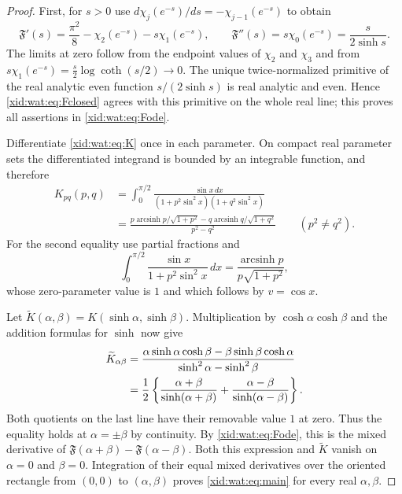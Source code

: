 \documentclass[11pt,a4paper]{article}
\numberwithin{equation}{section}
\theoremstyle{definition}
\theoremstyle{remark}
\begin{document}
\begin{proof}
First, for $s>0$ use
$d\chi_j(e^{-s})/ds=-\chi_{j-1}(e^{-s})$ to obtain
\[
 \mathfrak F'(s)=\frac{\pi^2}{8}
              -\chi_2(e^{-s})-s\chi_1(e^{-s}),
 \qquad
 \mathfrak F''(s)=s\chi_0(e^{-s})
                =\frac{s}{2\sinh s}.
\]
The limits at zero follow from the endpoint values of $\chi_2$ and
$\chi_3$ and from
$s\chi_1(e^{-s})=\tfrac{s}{2}\log\coth(s/2)\to0$.
The unique twice-normalized primitive of the real analytic even
function $s/(2\sinh s)$ is real analytic and even. Hence
\eqref{xid:wat:eq:Fclosed} agrees with this primitive on the whole real
line; this proves all assertions in \eqref{xid:wat:eq:Fode}.

Differentiate \eqref{xid:wat:eq:K} once in each parameter. On compact
real parameter sets the differentiated integrand is bounded by an
integrable function, and therefore
\begin{align*}
 K_{pq}(p,q)
 &=\int_0^{\pi/2}
       \frac{\sin x\,dx}
       {(1+p^2\sin^2x)(1+q^2\sin^2x)}\\
 &=\frac{p\operatorname{arcsinh}p/\sqrt{1+p^2}
       -q\operatorname{arcsinh}q/\sqrt{1+q^2}}{p^2-q^2}
       \qquad(p^2\ne q^2).
\end{align*}
For the second equality use partial fractions and
\[
 \int_0^{\pi/2}\frac{\sin x}{1+p^2\sin^2x}\,dx
       =\frac{\operatorname{arcsinh}p}{p\sqrt{1+p^2}},
\]
whose zero-parameter value is $1$ and which follows by
$v=\cos x$.

Let $\widetilde K(\alpha,\beta)=K(\sinh\alpha,\sinh\beta)$.
Multiplication by $\cosh\alpha\cosh\beta$ and the addition formulas
for $\sinh$ now give
\begin{align}\label{xid:wat:eq:hyperbolicmixed}
 \widetilde K_{\alpha\beta}
 &=\frac{\alpha\sinh\alpha\cosh\beta
        -\beta\sinh\beta\cosh\alpha}
       {\sinh^2\alpha-\sinh^2\beta}\notag\\
 &=\frac12\left\{
      \frac{\alpha+\beta}{\sinh(\alpha+\beta)}
     +\frac{\alpha-\beta}{\sinh(\alpha-\beta)}\right\}.
\end{align}
Both quotients on the last line have their removable value $1$ at
zero. Thus the equality holds at $\alpha=\pm\beta$ by continuity.
By \eqref{xid:wat:eq:Fode}, this is the mixed derivative of
$\mathfrak F(\alpha+\beta)-\mathfrak F(\alpha-\beta)$.
Both this expression and $\widetilde K$ vanish on $\alpha=0$ and
$\beta=0$. Integration of their equal mixed derivatives over the
oriented rectangle from $(0,0)$ to $(\alpha,\beta)$ proves
\eqref{xid:wat:eq:main} for every real $\alpha,\beta$.
\end{proof}
\end{document}

